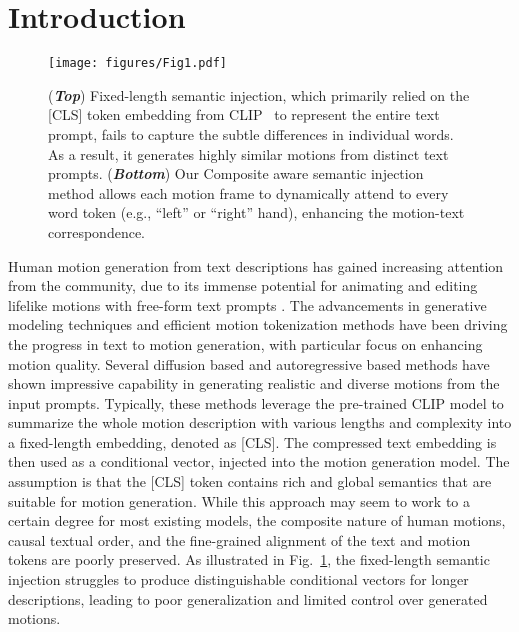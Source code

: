 \vspace{-10pt}
\section{Introduction} \label{sec:intro}
\vspace{-3pt}

\begin{figure}[!ht]
    \centering
    \texttt{[image: figures/Fig1.pdf]}
    \vspace{-35pt}
    \caption{(\textit{\textbf{Top}}) Fixed-length semantic injection, which primarily relied on the [CLS] token embedding from CLIP~\cite{radford2021learning} to represent the entire text prompt, fails to capture the subtle differences in individual words. As a result, it generates highly similar motions from distinct text prompts. (\textit{\textbf{Bottom}}) Our Composite aware semantic injection method allows each motion frame to dynamically attend to every word token (e.g., ``left'' or ``right'' hand), enhancing the motion-text correspondence.}
    \vspace{-10pt}
\label{fig:motivation}
\end{figure}

Human motion generation from text descriptions has gained increasing attention from the community, due to its immense potential for animating and editing lifelike motions with free-form text prompts \cite{MotionFix, goel2024iterative}.
The advancements in generative modeling techniques and efficient motion tokenization methods have been driving the progress in text to motion generation, with particular focus on enhancing motion quality.
Several diffusion based \cite{tevet2023human, zhang2022motiondiffuse, guo2023momask, chen2023executing, CondMDICohan2024, chang2024learning} and autoregressive based \cite{zhang2023generating, huang2024como, jiang2024motiongpt, chen2024motionllm} methods have shown impressive capability in generating realistic and diverse motions from the input prompts. 
Typically, these methods leverage the pre-trained CLIP model \cite{radford2021learning} to summarize the whole motion description with various lengths and complexity into a fixed-length embedding, denoted as [CLS]. 
The compressed text embedding is then used as a conditional vector, injected into the motion generation model.
The assumption is that the [CLS] token contains rich and global semantics that are suitable for motion generation. 
While this approach may seem to work to a certain degree for most existing models, the composite nature of human motions, causal textual order, and the fine-grained alignment of the text and motion tokens are poorly preserved. 
As illustrated in Fig.~\ref{fig:motivation}, the fixed-length semantic injection struggles to produce distinguishable conditional vectors for longer descriptions, leading to poor generalization and limited control over generated motions.



